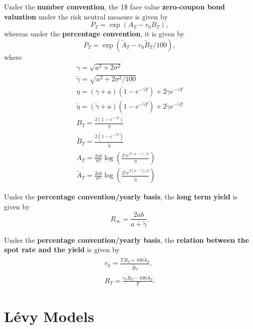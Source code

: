 \documentclass[10pt]{article}
\begin{document}
\begin{outline}
  \1 Under the \textbf{number convention}, the 1\$ face value \textbf{zero-coupon bond
    valuation} under the risk neutral measure is given by
  \begin{equation*}
    P_T = \exp(A_T - r_0B_T),
  \end{equation*}
  whereas under the \textbf{percentage convention}, it is given by
  \begin{equation*}
    P_T = \exp(\tilde A_T - r_0\tilde B_T/100),
  \end{equation*}
  where
  \begin{gather*}
    \gamma = \sqrt{a^2 + 2\sigma^2}\\
    \tilde\gamma = \sqrt{a^2 + 2\sigma^2/100}\\
    \eta = (\gamma+a)(1-e^{-\gamma T})+2\gamma e^{-\gamma T}\\
    \tilde \eta  = (\tilde\gamma + a)(1-e^{-\tilde\gamma T})+2\tilde\gamma e^{-\tilde\gamma T}\\
    B_T = \frac{2(1-e^{-\gamma T})}{\eta}\\
    \tilde B_T = \frac{2(1-e^{-\tilde\gamma T})}{\tilde\eta}\\
    A_T = \frac{2ab}{\sigma^2}\log\left(\frac{2\gamma
        e^{T(a-\gamma)/2}}{\eta}\right)\\
    \tilde A_T = \frac{2ab}{\sigma^2}\log\left(\frac{2\tilde\gamma
        e^{T(a-\tilde\gamma)/2}}{\tilde\eta}\right)
  \end{gather*}

  \1 Under the \textbf{percentage convention/yearly basis}, the \textbf{long term yield}
  is given by
  \begin{equation*}
    R_\infty = \frac{2ab}{a+\tilde\gamma}.
  \end{equation*}

  \1 Under the \textbf{percentage convention/yearly basis}, the \textbf{relation between
    the spot rate and the yield} is given by
  \begin{gather*}
    r_0 = \frac{T\,R_T + 100\tilde A_T}{\tilde B_T},\\
    R_T = \frac{r_0\tilde B_T - 100\tilde A_T}{T}.
  \end{gather*}
\end{outline}


\section{Lévy Models}
\end{document}
